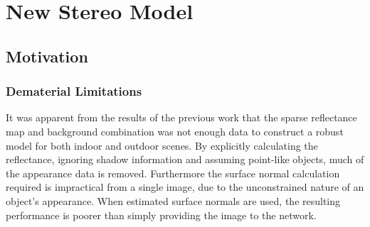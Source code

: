 \documentclass[ %
                    author={Gavin Parker},
                supervisor={Dr. Neill Campbell},
                    degree={MEng},
                     title={Deep Siamese Networks for Illumination Estimation from Stereo Images},
                  subtitle={},
                      type={Research},
                      year={2018} ]{dissertation}
\begin{document}
\chapter{New Stereo Model}
\section{Motivation}
\subsection{Dematerial Limitations}
It was apparent from the results of the previous work that the sparse reflectance map and background combination was not enough data to construct a robust model for both indoor and outdoor scenes. By explicitly calculating the reflectance, ignoring shadow information and assuming point-like objects, much of the appearance data is removed. Furthermore the surface normal calculation required is impractical from a single image, due to the unconstrained nature of an object's appearance. When estimated surface normals are used, the resulting performance is poorer than simply providing the image to the network.
\end{document}

